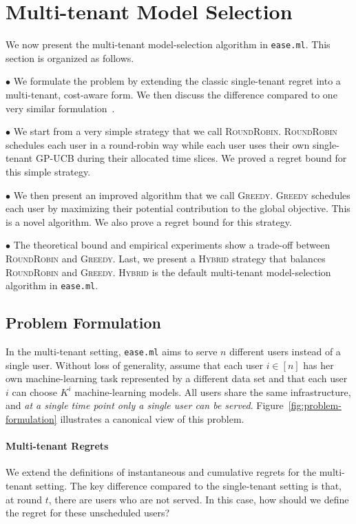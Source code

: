 \documentclass[letterpaper]{vldb}
\newcommand{\eml}{\texttt{ease.ml}\xspace}
\newcommand{\rr}{\textsc{RoundRobin}\xspace}
\newcommand{\hybrid}{\textsc{Hybrid}\xspace}
\newcommand{\greedy}{\textsc{Greedy}\xspace}
\begin{document}
\vspace{-1em}
\section{Multi-tenant Model Selection}\label{sec:multitenant}

We now present the multi-tenant model-selection
algorithm in \eml. This section is organized as follows.

\noindent
$\bullet$ We formulate the problem 
by extending the classic single-tenant regret
into a multi-tenant, cost-aware form. We then 
discuss the difference compared to
one very similar formulation~\cite{Swersky2013}.

\noindent
$\bullet$
We start from a very simple strategy that we call
\rr. \rr schedules
each user in a round-robin way while each user
uses their own single-tenant GP-UCB
during their allocated time slices. We proved 
a regret bound for this simple strategy.

\noindent
$\bullet$
We then present an improved algorithm that we
call \greedy. \greedy schedules
each user by maximizing their potential contribution
to the global objective. This is a novel algorithm.
We also prove a regret bound for this strategy.

\noindent
$\bullet$
The theoretical bound and empirical experiments
show a trade-off between \rr and
\greedy. Last, we present a \hybrid 
strategy that balances 
\rr and \greedy. \hybrid is the 
default multi-tenant model-selection algorithm
in \eml.


\vspace{-0.5em}
\subsection{Problem Formulation}

In the multi-tenant setting, \eml aims
to serve $n$ different users instead of a single user.
Without loss of generality, assume that
each user $i\in[n]$ has her own machine-learning 
task represented by a different data set
and that each user $i$ can choose
$K^{i}$ machine-learning models.
All users share the same infrastructure,
and {\em at a single time point only
a single user can be served}.
Figure~\ref{fig:problem-formulation} illustrates 
a canonical view of this problem.

\vspace{-0.5em}
\paragraph*{Multi-tenant Regrets} 
We extend the definitions of instantaneous and cumulative 
regrets for the multi-tenant setting. The key difference
compared to the single-tenant setting is that,
at round $t$, there are users who are not
served. In this case, how should we define
the regret for these unscheduled users?
\end{document}
